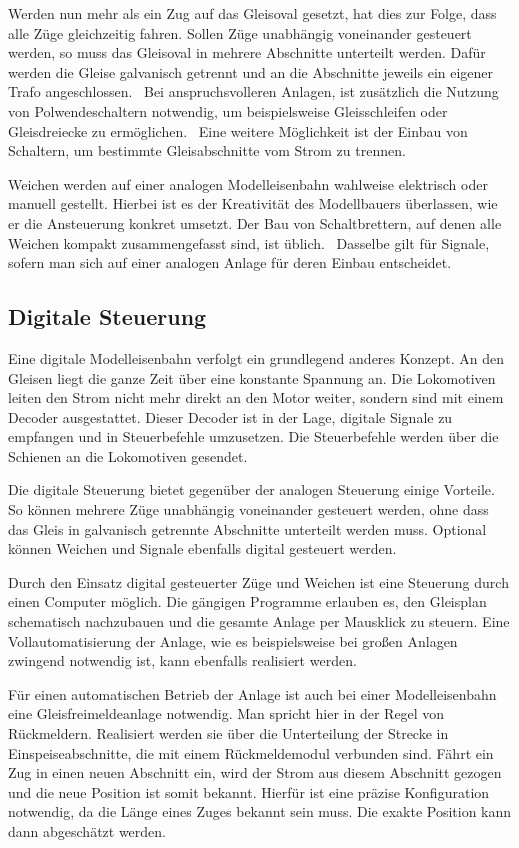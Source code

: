 Werden nun mehr als ein Zug auf das Gleisoval gesetzt, hat dies zur Folge, dass alle Züge gleichzeitig fahren. Sollen Züge unabhängig voneinander gesteuert werden, so muss das Gleisoval in mehrere Abschnitte unterteilt werden. Dafür werden die Gleise galvanisch getrennt und an die Abschnitte jeweils ein eigener Trafo angeschlossen.~\cite[][S. 181]{bib:Modellbauhandbuch} Bei anspruchsvolleren Anlagen, ist zusätzlich die Nutzung von Polwendeschaltern notwendig, um beispielsweise Gleisschleifen oder Gleisdreiecke zu ermöglichen.~\cite[][S. 183 f.]{bib:Modellbauhandbuch} Eine weitere Möglichkeit ist der Einbau von Schaltern, um bestimmte Gleisabschnitte vom Strom zu trennen.~\cite[][S. 182]{bib:Modellbauhandbuch}

Weichen werden auf einer analogen Modelleisenbahn wahlweise elektrisch oder manuell gestellt. Hierbei ist es der Kreativität des Modellbauers überlassen, wie er die Ansteuerung konkret umsetzt. Der Bau von Schaltbrettern, auf denen alle Weichen kompakt zusammengefasst sind, ist üblich.~\cite[][S. 185]{bib:Modellbauhandbuch} Dasselbe gilt für Signale, sofern man sich auf einer analogen Anlage für deren Einbau entscheidet.
\subsection{Digitale Steuerung}\label{text:Grundlagen:Steuerung-von-Modelleisenbahnen:Digitale-Steuerung}

Eine digitale Modelleisenbahn verfolgt ein grundlegend anderes Konzept. An den Gleisen liegt die ganze Zeit über eine konstante Spannung an. Die Lokomotiven leiten den Strom nicht mehr direkt an den Motor weiter, sondern sind mit einem Decoder ausgestattet. Dieser Decoder ist in der Lage, digitale Signale zu empfangen und in Steuerbefehle umzusetzen. Die Steuerbefehle werden über die Schienen an die Lokomotiven gesendet.

Die digitale Steuerung bietet gegenüber der analogen Steuerung einige Vorteile. So können mehrere Züge unabhängig voneinander gesteuert werden, ohne dass das Gleis in galvanisch getrennte Abschnitte unterteilt werden muss. Optional können Weichen und Signale ebenfalls digital gesteuert werden.

Durch den Einsatz digital gesteuerter Züge und Weichen ist eine Steuerung durch einen Computer möglich. Die gängigen Programme erlauben es, den Gleisplan schematisch nachzubauen und die gesamte Anlage per Mausklick zu steuern. Eine Vollautomatisierung der Anlage, wie es beispielsweise bei großen Anlagen zwingend notwendig ist, kann ebenfalls realisiert werden.

Für einen automatischen Betrieb der Anlage ist auch bei einer Modelleisenbahn eine Gleisfreimeldeanlage notwendig. Man spricht hier in der Regel von Rückmeldern. Realisiert werden sie über die Unterteilung der Strecke in Einspeiseabschnitte, die mit einem Rückmeldemodul verbunden sind. Fährt ein Zug in einen neuen Abschnitt ein, wird der Strom aus diesem Abschnitt gezogen und die neue Position ist somit bekannt. Hierfür ist eine präzise Konfiguration notwendig, da die Länge eines Zuges bekannt sein muss. Die exakte Position kann dann abgeschätzt werden.

